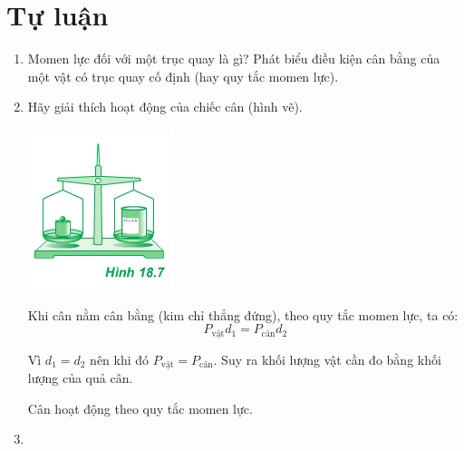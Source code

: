 \section{Tự luận}
\begin{enumerate}[label=\bfseries Câu \arabic*:]
	\item {}
	
	{
		Momen lực đối với một trục quay là gì? Phát biểu điều kiện cân bằng của một vật có trục quay cố định (hay quy tắc momen lực).
	}
	
	
	\item {}
	
	
	{Hãy giải thích hoạt động của chiếc cân (hình vẽ).
		\begin{center}
			\includegraphics[scale=1]{../figs/VN10-2021-PH-TP021-5.png}
		\end{center}
	}
	
	\hideall
	{
		Khi cân nằm cân bằng (kim chỉ thẳng đứng), theo quy tắc momen lực, ta có:
		$$P_\text{vật} d_1 = P_\text{cân} d_2$$
		
		Vì $d_1=d_2$ nên khi đó $P_\text{vật} = P_\text{cân}$. Suy ra khối lượng vật cần đo bằng khối lượng của quả cân.
		
		Cân hoạt động theo quy tắc momen lực.
	}
	\item {}
	

\end{enumerate}
